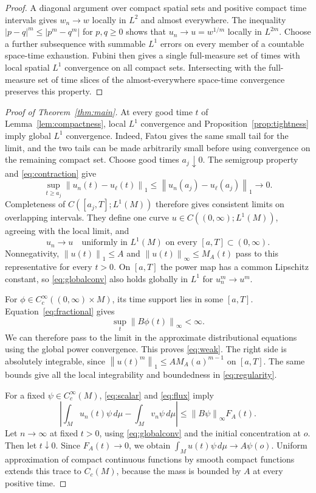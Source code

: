 \documentclass[11pt]{article}
\theoremstyle{remark}
\newcommand{\dd}{\,d\mu}
\newcommand{\norm}[1]{\left\lVert#1\right\rVert}
\begin{document}
\begin{proof}
A diagonal argument over compact spatial sets and positive compact time
intervals gives $w_n\to w$ locally in $L^2$ and almost everywhere.
The inequality $|p-q|^m\le|p^m-q^m|$ for $p,q\ge0$ shows that
$u_n\to u=w^{1/m}$ locally in $L^{2m}$.
Choose a further subsequence with summable $L^1$ errors on every member
of a countable space-time exhaustion. Fubini then gives a single
full-measure set of times with local spatial $L^1$ convergence on all
compact sets. Intersecting with the full-measure set of time slices of
the almost-everywhere space-time convergence preserves this property.
\end{proof}

\begin{proof}[Proof of Theorem~\ref{thm:main}]
At every good time $t$ of Lemma~\ref{lem:compactness}, local $L^1$
convergence and Proposition~\ref{prop:tightness} imply global $L^1$
convergence. Indeed, Fatou gives the same small tail for the limit, and
the two tails can be made arbitrarily small before using convergence on
the remaining compact set.
Choose good times $a_j\downarrow0$. The semigroup property and
\eqref{eq:contraction} give
\[
 \sup_{t\ge a_j}\norm{u_n(t)-u_\ell(t)}_1
 \le\norm{u_n(a_j)-u_\ell(a_j)}_1\longrightarrow0.
\]
Completeness of $C([a_j,T];L^1(M))$ therefore gives consistent limits
on overlapping intervals. They define one curve
$u\in C((0,\infty);L^1(M))$, agreeing with the local limit, and
\begin{equation}\label{eq:globalconv}
 u_n\longrightarrow u\quad\text{uniformly in }L^1(M)
            \text{ on every }[a,T]\subset(0,\infty).
\end{equation}
Nonnegativity, $\norm{u(t)}_1\le A$ and
$\norm{u(t)}_\infty\le M_A(t)$ pass to this representative for every
$t>0$. On $[a,T]$ the power map has a common Lipschitz constant, so
\eqref{eq:globalconv} also holds globally in $L^1$ for $u_n^m\to u^m$.

For $\phi\in C_c^\infty((0,\infty)\times M)$, its time support lies
in some $[a,T]$. Equation~\eqref{eq:fractional} gives
\[
 \sup_t\norm{B\phi(t)}_\infty<\infty.
\]
We can therefore pass to the limit
in the approximate distributional equations using the global power
convergence. This proves \eqref{eq:weak}. The right side is absolutely
integrable, since $\norm{u(t)^m}_1\le A M_A(a)^{m-1}$ on $[a,T]$.
The same bounds give all the local integrability and boundedness in
\eqref{eq:regularity}.

For a fixed $\psi\in C_c^\infty(M)$, \eqref{eq:scalar} and
\eqref{eq:flux} imply
\[
 \left|\int_Mu_n(t)\psi\dd-\int_Mv_n\psi\dd\right|
       \le\norm{B\psi}_\infty F_A(t).
\]
Let $n\to\infty$ at fixed $t>0$, using \eqref{eq:globalconv} and the
initial concentration at $o$. Then let $t\downarrow0$. Since
$F_A(t)\to0$, we obtain
$\int_Mu(t)\psi\dd\to A\psi(o)$.
Uniform approximation of compact continuous functions by smooth compact
functions extends this trace to $C_c(M)$, because the mass is bounded by
$A$ at every positive time.


\end{proof}
\end{document}
